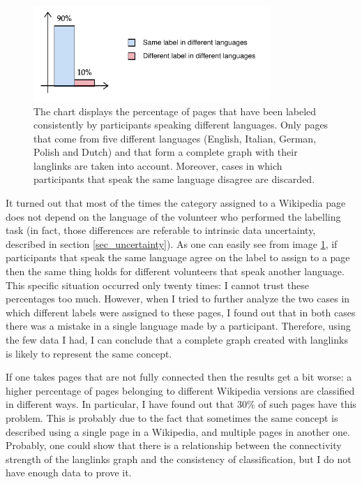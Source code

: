             \begin{figure}
                \centering
                \includegraphics[width=0.8\textwidth]{images/comparison_wikipedias.pdf}
                \caption{The chart displays the percentage of pages that have been labeled consistently by participants speaking different languages. Only pages that come from five different languages (English, Italian, German, Polish and Dutch) and that form a complete graph with their langlinks are taken into account. Moreover, cases in which participants that speak the same language disagree are discarded.}
                \label{comparison_wikipedias}
            \end{figure}
            
            It turned out that most of the times the category assigned to a Wikipedia page does not depend on the language of the volunteer who performed the labelling task (in fact, those differences are referable to intrinsic data uncertainty, described in section \ref{sec_uncertainty}). As one can easily see from image \ref{comparison_wikipedias}, if participants that speak the same language agree on the label to assign to a page then the same thing holds for different volunteers that speak another language. This specific situation occurred only twenty times: I cannot trust these percentages too much. However, when I tried to further analyze the two cases in which different labels were assigned to these pages, I found out that in both cases there was a mistake in a single language made by a participant. Therefore, using the few data I had, I can conclude that a complete graph created with langlinks is likely to represent the same concept.
            
            If one takes pages that are not fully connected then the results get a bit worse: a higher percentage of pages belonging to different Wikipedia versions are classified in different ways. In particular, I have found out that 30\% of such pages have this problem. This is probably due to the fact that sometimes the same concept is described using a single page in a Wikipedia, and multiple pages in another one. Probably, one could show that there is a relationship between the connectivity strength of the langlinks graph and the consistency of classification, but I do not have enough data to prove it.
